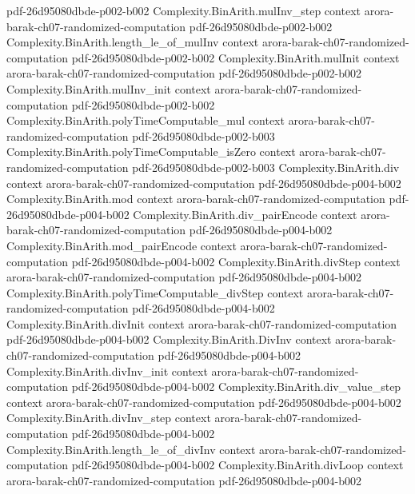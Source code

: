 \begin{theorem}
  {pdf-26d95080dbde-p002-b002}
\proofstep
  {Complexity.BinArith.mulInv_step}
  {context}
  {arora-barak-ch07-randomized-computation}
  {pdf-26d95080dbde-p002-b002}
\proofstep
  {Complexity.BinArith.length_le_of_mulInv}
  {context}
  {arora-barak-ch07-randomized-computation}
  {pdf-26d95080dbde-p002-b002}
\proofstep
  {Complexity.BinArith.mulInit}
  {context}
  {arora-barak-ch07-randomized-computation}
  {pdf-26d95080dbde-p002-b002}
\proofstep
  {Complexity.BinArith.mulInv_init}
  {context}
  {arora-barak-ch07-randomized-computation}
  {pdf-26d95080dbde-p002-b002}
\proofstep
  {Complexity.BinArith.polyTimeComputable_mul}
  {context}
  {arora-barak-ch07-randomized-computation}
  {pdf-26d95080dbde-p002-b003}
\proofstep
  {Complexity.BinArith.polyTimeComputable_isZero}
  {context}
  {arora-barak-ch07-randomized-computation}
  {pdf-26d95080dbde-p002-b003}
\proofstep
  {Complexity.BinArith.div}
  {context}
  {arora-barak-ch07-randomized-computation}
  {pdf-26d95080dbde-p004-b002}
\proofstep
  {Complexity.BinArith.mod}
  {context}
  {arora-barak-ch07-randomized-computation}
  {pdf-26d95080dbde-p004-b002}
\proofstep
  {Complexity.BinArith.div_pairEncode}
  {context}
  {arora-barak-ch07-randomized-computation}
  {pdf-26d95080dbde-p004-b002}
\proofstep
  {Complexity.BinArith.mod_pairEncode}
  {context}
  {arora-barak-ch07-randomized-computation}
  {pdf-26d95080dbde-p004-b002}
\proofstep
  {Complexity.BinArith.divStep}
  {context}
  {arora-barak-ch07-randomized-computation}
  {pdf-26d95080dbde-p004-b002}
\proofstep
  {Complexity.BinArith.polyTimeComputable_divStep}
  {context}
  {arora-barak-ch07-randomized-computation}
  {pdf-26d95080dbde-p004-b002}
\proofstep
  {Complexity.BinArith.divInit}
  {context}
  {arora-barak-ch07-randomized-computation}
  {pdf-26d95080dbde-p004-b002}
\proofstep
  {Complexity.BinArith.DivInv}
  {context}
  {arora-barak-ch07-randomized-computation}
  {pdf-26d95080dbde-p004-b002}
\proofstep
  {Complexity.BinArith.divInv_init}
  {context}
  {arora-barak-ch07-randomized-computation}
  {pdf-26d95080dbde-p004-b002}
\proofstep
  {Complexity.BinArith.div_value_step}
  {context}
  {arora-barak-ch07-randomized-computation}
  {pdf-26d95080dbde-p004-b002}
\proofstep
  {Complexity.BinArith.divInv_step}
  {context}
  {arora-barak-ch07-randomized-computation}
  {pdf-26d95080dbde-p004-b002}
\proofstep
  {Complexity.BinArith.length_le_of_divInv}
  {context}
  {arora-barak-ch07-randomized-computation}
  {pdf-26d95080dbde-p004-b002}
\proofstep
  {Complexity.BinArith.divLoop}
  {context}
  {arora-barak-ch07-randomized-computation}
  {pdf-26d95080dbde-p004-b002}

\end{theorem}
